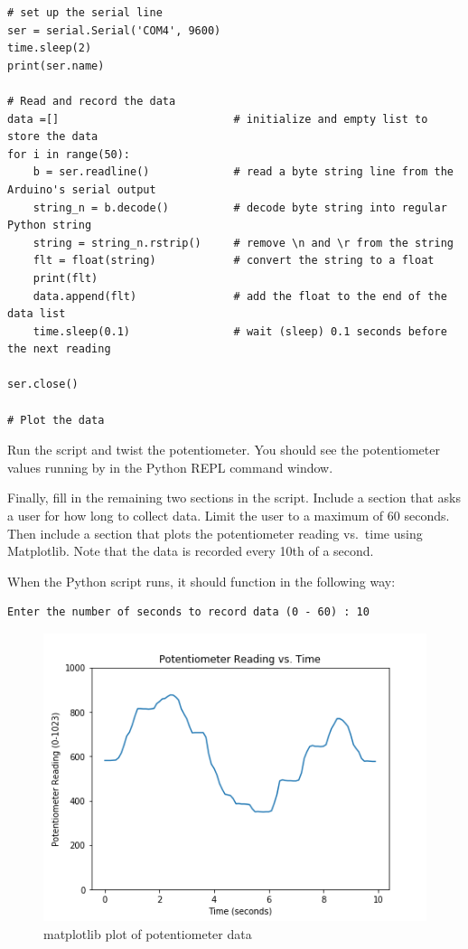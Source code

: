 \documentclass[11pt]{article}
\begin{document}
\begin{verbatim}
# set up the serial line
ser = serial.Serial('COM4', 9600)
time.sleep(2)
print(ser.name)

# Read and record the data
data =[]                           # initialize and empty list to store the data
for i in range(50):
    b = ser.readline()             # read a byte string line from the Arduino's serial output
    string_n = b.decode()          # decode byte string into regular Python string
    string = string_n.rstrip()     # remove \n and \r from the string
    flt = float(string)            # convert the string to a float
    print(flt)
    data.append(flt)               # add the float to the end of the data list
    time.sleep(0.1)                # wait (sleep) 0.1 seconds before the next reading

ser.close()

# Plot the data
\end{verbatim}

Run the script and twist the potentiometer. You should see the
potentiometer values running by in the Python REPL command window.

Finally, fill in the remaining two sections in the script. Include a
section that asks a user for how long to collect data. Limit the user to
a maximum of 60 seconds. Then include a section that plots the
potentiometer reading vs.~time using Matplotlib. Note that the data is
recorded every 10th of a second.

When the Python script runs, it should function in the following way:

\begin{verbatim}
Enter the number of seconds to record data (0 - 60) : 10
\end{verbatim}

\begin{figure}
\centering
\includegraphics{images/potentiometer_reading.png}
\caption{matplotlib plot of potentiometer data}
\end{figure}
\end{document}
